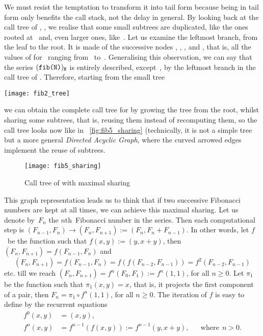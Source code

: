 We must resist the temptation to transform it into tail form because
being in tail form only benefits the call stack, not the delay in
general. By looking back at the call tree of ,
, we realise that some small subtrees are
duplicated, like the ones rooted at~ and, even larger
ones, like~. Let us examine the leftmost branch, from
the leaf to the root. It is made of the successive nodes
, , , 
and , that is, all the values of 
for~ ranging from~ to~. Generalising
this observation, we can say that the series
\((\texttt{fib(N)})_{\texttt{N}}\) is entirely described,
except~, by the leftmost branch in the call tree of
. Therefore, starting from the small tree
\begin{center}
\texttt{[image: fib2\_tree]}
\end{center}
we can obtain the complete call tree for  by growing
the tree from the root, whilst sharing some subtrees, that is, reusing
them instead of recomputing them, so the call tree looks now like in
\fig~\vref{fig:fib5_sharing} (technically, it is not a simple tree but
a more general \emph{Directed Acyclic Graph}, where the curved arrowed
edges implement the reuse of subtrees.
\begin{figure}
\centering
\texttt{[image: fib5\_sharing]}
\caption{Call tree of  with maximal sharing
\label{fig:fib5_sharing}}
\end{figure}
This graph representation leads us to think that if two successive
Fibonacci numbers are kept at all times, we can achieve this maximal
sharing. Let us denote by~\(F_n\) the \(n\)th~Fibonacci number in the
series. Then each computational step is \((F_{n-1},F_{n}) \rightarrow
(F_{n}, F_{n+1}) := (F_{n},F_{n}+F_{n-1})\). In other words,
let \(f\)~be the function such that \(f(x,y) := (y,x+y)\),
then \((F_{n},F_{n+1}) = f(F_{n-1},F_{n})\) and
\[
(F_n,F_{n+1}) = f(F_{n-1},F_{n}) = f(f(F_{n-2},F_{n-1})) =
f^2(F_{n-2},F_{n-1})
\]
etc. till we reach \((F_{n},F_{n+1}) = f^n(F_0,F_1) :=
f^{n}(1,1)\), for all \(n \geqslant 0\). Let \(\pi_1\) be the function
such that \(\pi_1(x,y) = x\), that is, it projects the first component
of a pair, then \(F_n = \pi_1 \circ f^n(1,1)\), for all \(n \geqslant
0\). The iteration of \(f\) is easy to define by the recurrent
equations
\begin{align*}
f^0(x,y) &= (x,y),\\
f^n(x,y) &= f^{n-1}(f(x,y)) := f^{n-1}(y,x+y), && \text{where} \,\; n > 0.
\end{align*}
